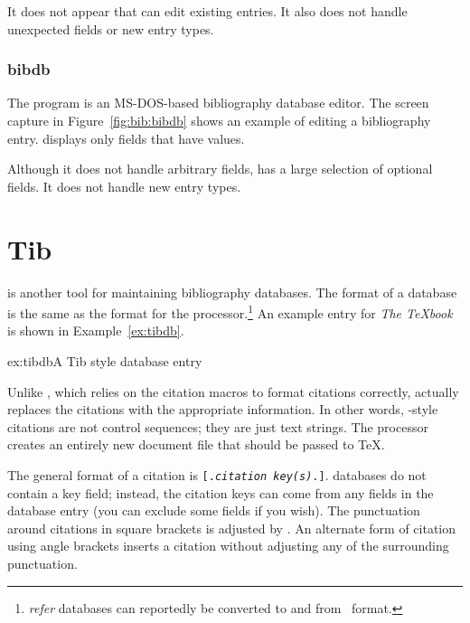 
It does not appear that  can edit existing entries.
It also does not handle unexpected fields or
new entry types.

\subsubsection{bibdb}

The  program is an MS-DOS-based bibliography
database editor.  The screen capture in Figure~\ref{fig:bib:bibdb} shows an
example of  editing a bibliography entry.  
displays only fields that have values.


Although it does not handle arbitrary fields,  has a large
selection of optional fields.
It does not handle new entry types.

\section{Tib}

 is another tool for maintaining bibliography databases.  The
format of a  database is the same as the format for the
 
processor.\footnote{\textit{refer} databases can reportedly be
converted to and from \BibTeX\ format.}  An example entry for
\textit{The \TeX{}book} is shown in Example~\ref{ex:tibdb}.

\begin{example}{ex:tibdb}{A Tib style database entry}
\end{example}

Unlike \BibTeX, which relies on the citation macros to 
format citations correctly,  actually replaces the 
citations with 
the appropriate information.  In other words, -style citations
are not control sequences; they are just text strings.  The  
processor creates an entirely new document file that should be passed
to \TeX.

The general format of a  citation is
\verb|[.|\texttt{\textit{citation key(s)}}\verb|.]|.
 databases do not contain a key field; instead,
the citation keys can come from any fields in the
database entry (you can exclude some fields
if you wish).
The punctuation around citations in square brackets is adjusted by
.  An alternate form of citation using angle brackets inserts
a citation without adjusting any of the surrounding punctuation.

